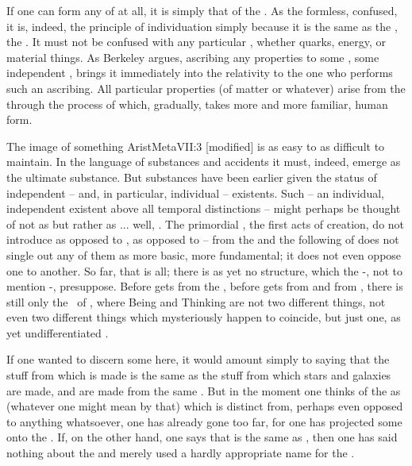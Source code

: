 If one can form any  of  at all, it is simply
that of the .  As the formless, confused,  it is,
indeed, the principle of individuation simply because it is the same as the
, the .  It must not be confused with any particular
, whether quarks, energy, or  material things.  As
Berkeley argues, ascribing any properties to some  ,
some independent , brings it immediately into the relativity to the
one who performs such an ascribing.  All particular properties (of matter or
whatever) arise from the  through the  process of
 which, gradually, takes more and more familiar, human form.

The image of something \citet{which remains when all else is stripped
  off}{AristMeta}{VII:3 [modified]} is as easy to  as difficult to
maintain. In the language of substances and accidents it must, indeed, emerge as
the ultimate substance. But substances have been earlier given the status of
independent -- and, in particular, individual -- existents. Such 
-- an individual, independent existent above all temporal distinctions -- might
perhaps be thought of not as  but rather as ... well, .
The primordial , the first acts of creation, do not introduce
 as opposed to ,  as opposed to  --
 from the  and the following  of
 does not single out any of them as more basic, more
fundamental; it does not even oppose one to another.  So far, that is all; there
is as yet no structure, which the  -,
not to mention -, presuppose.  Before  gets
 from the , before  gets 
from  and  from , there is still only the
\nexus\ of , where Being and Thinking are not two different things,
not even two different things which mysteriously happen to coincide, but just
one, as yet undifferentiated \nexus.

If one wanted to discern some  here, it would amount simply to
saying that the stuff from which  is made is the same as the stuff
from which stars and galaxies are made,  and  are made from
the same .  But in the moment one thinks of the  as 
(whatever one might mean by that) which is distinct from, perhaps even opposed
to anything whatsoever, one has already gone too far, for one has projected some
 onto the .  If, on the other hand, one says
that  is the same as , then one has said nothing about the
 and merely used a hardly appropriate name for the .


